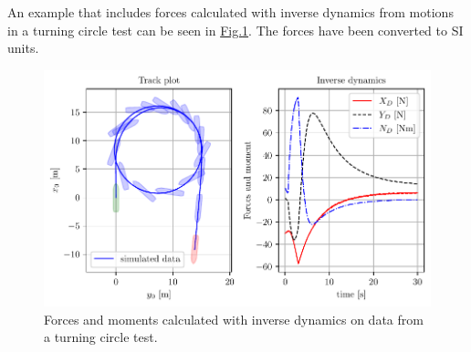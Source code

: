 \noindent An example that includes forces calculated with inverse dynamics from motions in a turning circle test can be seen in \hyperref[\detokenize{03.01_inverse_dynamics:fig-inverse}]{Fig.\@ \ref{\detokenize{03.01_inverse_dynamics:fig-inverse}}}. The forces have been converted to SI units.

\begin{figure}[H]
    \centering
    \includegraphics[width=\textwidth]{kappa/images/1.pdf}
    \caption{Forces and moments calculated with inverse dynamics on data from a turning circle test.}
    \label{\detokenize{03.01_inverse_dynamics:fig-inverse}}
\end{figure}

